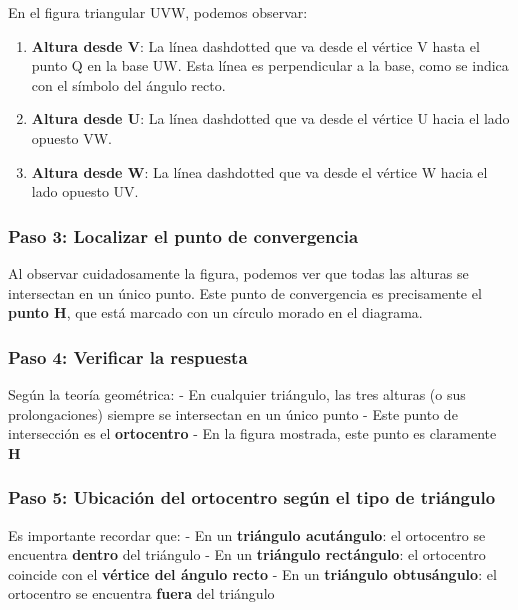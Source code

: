 \documentclass[
]{article}
\begin{document}
En el figura triangular UVW, podemos observar:

\begin{enumerate}
\def\labelenumi{\arabic{enumi}.}
\item
  \textbf{Altura desde V}: La línea dashdotted que va desde el vértice V
  hasta el punto Q en la base UW. Esta línea es perpendicular a la base,
  como se indica con el símbolo del ángulo recto.
\item
  \textbf{Altura desde U}: La línea dashdotted que va desde el vértice U
  hacia el lado opuesto VW.
\item
  \textbf{Altura desde W}: La línea dashdotted que va desde el vértice W
  hacia el lado opuesto UV.
\end{enumerate}

\subsubsection{Paso 3: Localizar el punto de
convergencia}\label{paso-3-localizar-el-punto-de-convergencia}

Al observar cuidadosamente la figura, podemos ver que todas las alturas
se intersectan en un único punto. Este punto de convergencia es
precisamente el \textbf{punto H}, que está marcado con un círculo morado
en el diagrama.

\subsubsection{Paso 4: Verificar la
respuesta}\label{paso-4-verificar-la-respuesta}

Según la teoría geométrica: - En cualquier triángulo, las tres alturas
(o sus prolongaciones) siempre se intersectan en un único punto - Este
punto de intersección es el \textbf{ortocentro} - En la figura mostrada,
este punto es claramente \textbf{H}

\subsubsection{Paso 5: Ubicación del ortocentro según el tipo de
triángulo}\label{paso-5-ubicaciuxf3n-del-ortocentro-seguxfan-el-tipo-de-triuxe1ngulo}

Es importante recordar que: - En un \textbf{triángulo acutángulo}: el
ortocentro se encuentra \textbf{dentro} del triángulo - En un
\textbf{triángulo rectángulo}: el ortocentro coincide con el
\textbf{vértice del ángulo recto} - En un \textbf{triángulo
obtusángulo}: el ortocentro se encuentra \textbf{fuera} del triángulo
\end{document}
